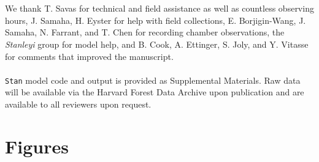 \documentclass[11pt]{article}
\begin{document}
\vspace{2ex}\\
\vspace{1ex}\\
We thank T. Savas for technical and field assistance as well as countless observing hours, J. Samaha, H. Eyster for help with field collections, E. Borjigin-Wang, J. Samaha, N. Farrant, and T. Chen for recording chamber observations, the \emph{Stanleyi} group for model help, and B. Cook, A. Ettinger, S. Joly, and Y. Vitasse for comments that improved the manuscript. 
\vspace{2ex}\\
\vspace{1ex}\\
\texttt{Stan} model code and output is provided as Supplemental Materials. Raw data will be available via the Harvard Forest Data Archive upon publication and are available to all reviewers upon request. 
\newpage





\newpage
\section*{Figures}



\end{document}
